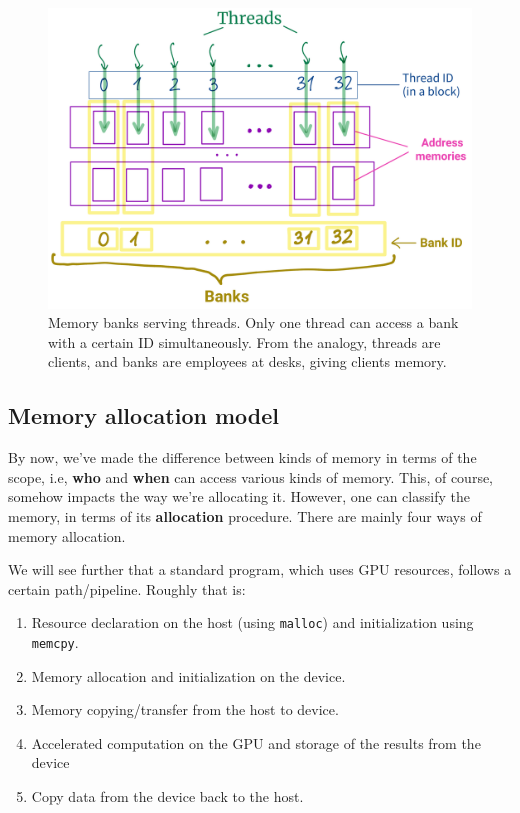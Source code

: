 \begin{figure}[H]
   \centering
   \includegraphics[scale=0.18]{pngs/banks1.png}
   \caption{Memory banks serving threads. Only one thread can access a bank with a certain ID simultaneously. 
   From the analogy, threads are clients, and banks are employees at desks, giving clients memory.}
   \label{banks}

\end{figure}

\subsection{Memory allocation model}
\label{subsection:mem_alloc_model}
By now, we've made the difference between kinds of memory in terms of the scope, i.e, 
\textbf{who} and \textbf{when} can access various kinds of memory. This, of course, somehow impacts the way we're allocating it. 
However, one can classify the memory, in terms of its \textbf{allocation} procedure. There are mainly four ways of memory allocation.

We will see further that a standard
program, which uses GPU resources, follows a certain path/pipeline. 
Roughly that is: 
\begin{enumerate}
\setlength\itemsep{-0.1em}
  \item Resource declaration on the host (using \verb|malloc|) and initialization using \verb|memcpy|.
  \item Memory allocation and initialization on the device.
  \item Memory copying/transfer from the host to device.
  \item Accelerated computation on the GPU and storage of the results from the device
  \item Copy data from the device back to the host.
\end{enumerate}

